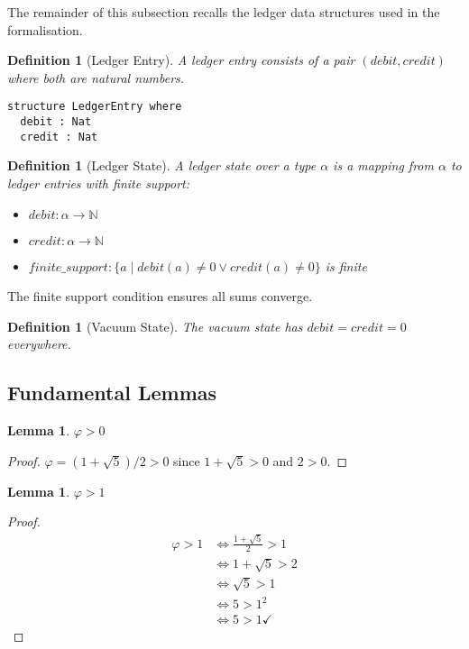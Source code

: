 \documentclass[11pt]{article}
\numberwithin{equation}{section}
\newtheorem{lemma}[theorem]{Lemma}
\newtheorem{definition}[theorem]{Definition}
\theoremstyle{remark}
\newcommand{\N}{\mathbb{N}}
\begin{document}
\medskip
The remainder of this subsection recalls the ledger data structures used in the
formalisation.

\begin{definition}[Ledger Entry]
A ledger entry consists of a pair $(debit, credit)$ where both are natural numbers.
\begin{lstlisting}
structure LedgerEntry where
  debit : Nat
  credit : Nat
\end{lstlisting}
\end{definition}

\begin{definition}[Ledger State]
A ledger state over a type $\alpha$ is a mapping from $\alpha$ to ledger entries with finite support:
\begin{itemize}
\item $debit : \alpha \to \N$
\item $credit : \alpha \to \N$  
\item $finite\_support : \{a \mid debit(a) \neq 0 \vee credit(a) \neq 0\}$ is finite
\end{itemize}
\end{definition}

The finite support condition ensures all sums converge.

\begin{definition}[Vacuum State]
The vacuum state has $debit = credit = 0$ everywhere.
\end{definition}

\subsection{Fundamental Lemmas}

\begin{lemma}
$\varphi > 0$
\end{lemma}
\begin{proof}
$\varphi = (1 + \sqrt{5})/2 > 0$ since $1 + \sqrt{5} > 0$ and $2 > 0$.
\end{proof}

\begin{lemma}
$\varphi > 1$
\end{lemma}
\begin{proof}
\begin{align}
\varphi > 1 &\iff \frac{1 + \sqrt{5}}{2} > 1\\
&\iff 1 + \sqrt{5} > 2\\
&\iff \sqrt{5} > 1\\
&\iff 5 > 1^2\\
&\iff 5 > 1 \checkmark
\end{align}
\end{proof}
\end{document}
